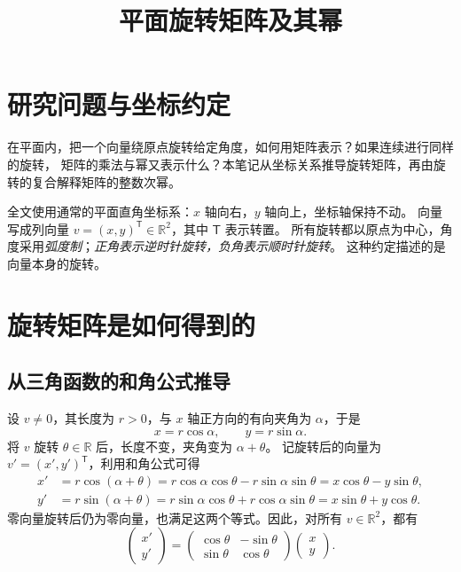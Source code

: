 \documentclass[UTF8,12pt,a4paper,fontset=fandol]{ctexart}
\title{平面旋转矩阵及其幂}
\author{}
\date{}
\begin{document}
\maketitle


\section{研究问题与坐标约定}
在平面内，把一个向量绕原点旋转给定角度，如何用矩阵表示？如果连续进行同样的旋转，
矩阵的乘法与幂又表示什么？本笔记从坐标关系推导旋转矩阵，再由旋转的复合解释矩阵的整数次幂。


全文使用通常的平面直角坐标系：$x$ 轴向右，$y$ 轴向上，坐标轴保持不动。
向量写成列向量 $v=(x,y)^{\mathsf T}\in\mathbb R^2$，其中 $\mathsf T$ 表示转置。
所有旋转都以原点为中心，角度采用\textit{弧度制}；\emph{正角表示逆时针旋转，负角表示顺时针旋转}。
这种约定描述的是向量本身的旋转。


\section{旋转矩阵是如何得到的}
\subsection{从三角函数的和角公式推导}
设 $v\ne0$，其长度为 $r>0$，与 $x$ 轴正方向的有向夹角为 $\alpha$，于是
\[
  x=r\cos\alpha,\qquad y=r\sin\alpha.
\]
将 $v$ 旋转 $\theta\in\mathbb R$ 后，长度不变，夹角变为 $\alpha+\theta$。
记旋转后的向量为 $v'=(x',y')^{\mathsf T}$，利用和角公式可得
\begin{align*}
  x'&=r\cos(\alpha+\theta)
     =r\cos\alpha\cos\theta-r\sin\alpha\sin\theta
     =x\cos\theta-y\sin\theta,\\
  y'&=r\sin(\alpha+\theta)
     =r\sin\alpha\cos\theta+r\cos\alpha\sin\theta
     =x\sin\theta+y\cos\theta.
\end{align*}
零向量旋转后仍为零向量，也满足这两个等式。因此，对所有 $v\in\mathbb R^2$，都有
\begin{equation}
  \begin{pmatrix}x'\\y'\end{pmatrix}
  =\begin{pmatrix}
    \cos\theta&-\sin\theta\\
    \sin\theta&\cos\theta
  \end{pmatrix}
  \begin{pmatrix}x\\y\end{pmatrix}.
  \label{eq:rotation-coordinate}
\end{equation}
\end{document}
